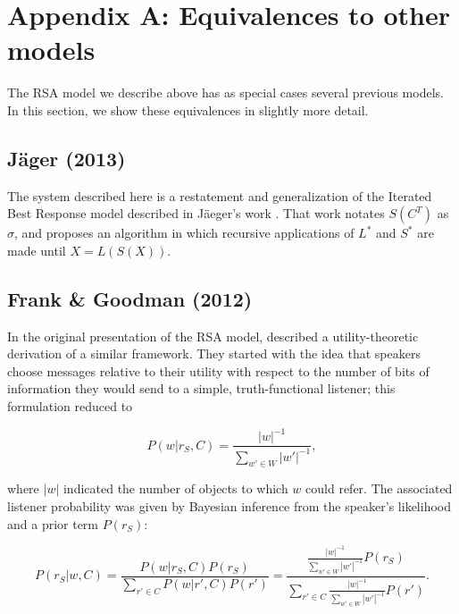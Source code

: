 \section{Appendix A: Equivalences to other models}
\label{app:equivalences}

The RSA model we describe above has as special cases several previous models. In this section, we show these equivalences in slightly more detail.

\subsection{J\"ager (2013)}

The system described here is a restatement and generalization of the Iterated Best Response model described in J\"aeger's work \cite{jaegerinpress}. That work notates $S(C^T)$ as $\sigma$, and proposes an algorithm in which recursive applications of $L^*$ and $S^*$ are made until $X = L(S(X))$. 

\subsection{Frank \& Goodman (2012)}

In the original presentation of the RSA model,  described a utility-theoretic derivation of a similar framework. They started with the idea that speakers choose messages relative to their utility with respect to the number of bits of information they would send to a simple, truth-functional listener; this formulation reduced to

\begin{equation}
P(w|r_S,C) = \frac{|w|^{-1}}{\displaystyle \sum_{w' \in W} {|w'|^{-1}}},
\end{equation}

where $|w|$ indicated the number of objects to which $w$ could refer. The associated listener probability was given by Bayesian inference from the speaker's likelihood and a prior term $P(r_S)$:

\begin{equation}
\label{eq:fg}
P(r_S | w, C) 
= \frac{P(w | r_S, C) P(r_S)}{\displaystyle \sum_{r' \in C}{P(w | r', C) P(r')}} =
\frac{\frac{\displaystyle |w|^{-1}}{\displaystyle \sum_{w' \in W} {|w'|^{-1}}}P(r_S)}{\displaystyle \sum_{r' \in C}{\frac{|w|^{-1}}{\displaystyle \sum_{w' \in W} {|w'|^{-1}}}P(r')}}.
\end{equation}

